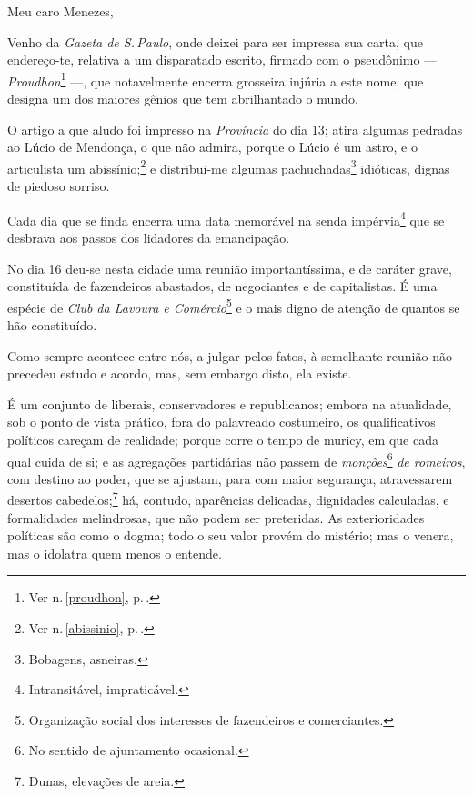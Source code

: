 Meu caro Menezes,

Venho da \emph{Gazeta de S.\,Paulo}, onde deixei para ser impressa sua
carta, que endereço-te, relativa a um disparatado escrito, firmado com o
pseudônimo --- \emph{Proudhon}\footnote{Ver n.\,\ref{proudhon}, p.\,\pageref{proudhon}.}
---, que notavelmente encerra grosseira injúria a este nome, que
designa um dos maiores gênios que tem abrilhantado o mundo.

O artigo a que aludo foi impresso na \emph{Província} do dia 13; atira
algumas pedradas ao Lúcio de Mendonça, o que não admira, porque o Lúcio
é um astro, e o articulista um abissínio;\footnote{Ver n.\,\ref{abissinio}, p.\,\pageref{abissinio}.} e distribui-me algumas pachuchadas\footnote{
  Bobagens, asneiras.} idióticas, dignas de piedoso sorriso.

Cada dia que se finda encerra uma data memorável na senda
impérvia\footnote{Intransitável, impraticável.} que se desbrava aos
passos dos lidadores da emancipação.

No dia 16 deu-se nesta cidade uma reunião importantíssima, e de caráter
grave, constituída de fazendeiros abastados, de negociantes e de
capitalistas. É uma espécie de \emph{Club da Lavoura e
Comércio}\footnote{Organização social dos interesses de fazendeiros e
  comerciantes.} e o mais digno de atenção de quantos se hão
constituído.

Como sempre acontece entre nós, a julgar pelos fatos, à semelhante
reunião não precedeu estudo e acordo, mas, sem embargo disto, ela
existe.

É um conjunto de liberais, conservadores e republicanos; embora na
atualidade, sob o ponto de vista prático, fora do palavreado costumeiro,
os qualificativos políticos careçam de realidade; porque corre o tempo
de muricy, em que cada qual cuida de si; e as agregações partidárias não
passem de \emph{monções}\footnote{No sentido de ajuntamento ocasional.}
\emph{de romeiros}, com destino ao poder, que se ajustam, para com maior
segurança, atravessarem desertos cabedelos;\footnote{Dunas, elevações
  de areia.} há, contudo, aparências delicadas, dignidades calculadas,
e formalidades melindrosas, que não podem ser preteridas. As
exterioridades políticas são como o dogma; todo o seu valor provém do
mistério; mas o venera, mas o idolatra quem menos o entende.


